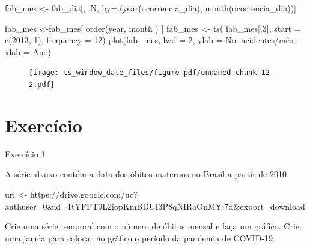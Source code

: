 \documentclass[
  letterpaper,
  DIV=11,
  numbers=noendperiod]{scrreprt}
\newenvironment{Shaded}{\begin{snugshade}}{\end{snugshade}}
\newcommand{\AttributeTok}[1]{\textcolor[rgb]{0.40,0.45,0.13}{#1}}
\newcommand{\DecValTok}[1]{\textcolor[rgb]{0.68,0.00,0.00}{#1}}
\newcommand{\FunctionTok}[1]{\textcolor[rgb]{0.28,0.35,0.67}{#1}}
\newcommand{\NormalTok}[1]{\textcolor[rgb]{0.00,0.23,0.31}{#1}}
\newcommand{\OtherTok}[1]{\textcolor[rgb]{0.00,0.23,0.31}{#1}}
\newcommand{\StringTok}[1]{\textcolor[rgb]{0.13,0.47,0.30}{#1}}
\theoremstyle{definition}
\theoremstyle{plain}
\theoremstyle{definition}
\theoremstyle{plain}
\theoremstyle{remark}
\begin{document}
\begin{Shaded}
\begin{Highlighting}[]
\NormalTok{fab\_mes }\OtherTok{\textless{}{-}}\NormalTok{ fab\_dia[, .N, by}\OtherTok{=}\NormalTok{.(}\FunctionTok{year}\NormalTok{(ocorrencia\_dia), }\FunctionTok{month}\NormalTok{(ocorrencia\_dia))]}

\NormalTok{fab\_mes }\OtherTok{\textless{}{-}}\NormalTok{fab\_mes[ }\FunctionTok{order}\NormalTok{(year, month ) ]}
\NormalTok{fab\_mes }\OtherTok{\textless{}{-}} \FunctionTok{ts}\NormalTok{( fab\_mes[,}\DecValTok{3}\NormalTok{], }\AttributeTok{start =} \FunctionTok{c}\NormalTok{(}\DecValTok{2013}\NormalTok{, }\DecValTok{1}\NormalTok{), }\AttributeTok{frequency =} \DecValTok{12}\NormalTok{)}
\FunctionTok{plot}\NormalTok{(fab\_mes, }\AttributeTok{lwd =} \DecValTok{2}\NormalTok{, }\AttributeTok{ylab =} \StringTok{\textquotesingle{}No. acidentes/mês\textquotesingle{}}\NormalTok{, }\AttributeTok{xlab =} \StringTok{\textquotesingle{}Ano\textquotesingle{}}\NormalTok{)}
\end{Highlighting}
\end{Shaded}

\begin{figure}[H]

{\centering \texttt{[image: ts\_window\_date\_files/figure-pdf/unnamed-chunk-12-2.pdf]}

}

\end{figure}

\hypertarget{exercuxedcio}{%
\section{Exercício}\label{exercuxedcio}}

Exercício 1

A série abaixo contém a data dos óbitos maternos no Brasil a partir de
2010.

\begin{Shaded}
\begin{Highlighting}[]
\NormalTok{url }\OtherTok{\textless{}{-}} \StringTok{\textquotesingle{}https://drive.google.com/uc?authuser=0\&id=1tYFFT9L2iopKmBDUI3P8qNIRaOnMYj7d\&export=download\textquotesingle{}}
\end{Highlighting}
\end{Shaded}

Crie uma série temporal com o número de óbitos mensal e faça um gráfico.
Crie uma janela para colocar no gráfico o período da pandemia de
COVID-19.
\end{document}
